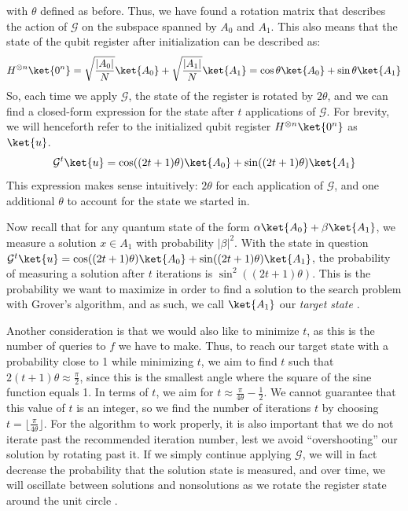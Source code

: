 with $\theta$ defined as before. Thus, we have found a rotation matrix that describes the action of $\mathcal{G}$ on the subspace spanned by $A_0$ and $A_1$. This also means that the state of the qubit register after initialization can be described as:
\[
H^{\otimes n} \ket{0^n} = \sqrt{\frac{|A_0|}{N}}\ket{A_0} + \sqrt{\frac{|A_1|}{N}}\ket{A_1} = \cos \theta \ket{A_0} + \sin \theta \ket{A_1}
\]
So, each time we apply $\mathcal{G}$, the state of the register is rotated by $2\theta$, and we can find a closed-form expression for the state after $t$ applications of $\mathcal{G}$. For brevity, we will henceforth refer to the initialized qubit register $H^{\otimes n} \ket{0^n}$ as $\ket{u}$.
\[
    \mathcal{G}^t \ket{u} = \cos ((2t+1)\theta) \ket{A_0} + \sin ((2t+1)\theta) \ket{A_1}
\]
This expression makes sense intuitively: $2\theta$ for each application of $\mathcal{G}$, and one additional $\theta$ to account for the state we started in.

Now recall that for any quantum state of the 
form $\alpha\ket{A_0} + \beta \ket{A_1}$, we measure a solution $x \in A_1$ with probability $|\beta|^2$. With the state in question $\mathcal{G}^t \ket{u} = \cos ((2t+1)\theta) \ket{A_0} + \sin ((2t+1)\theta) \ket{A_1}$, the probability of measuring a solution after $t$ iterations is $\sin^2((2t+1)\theta)$. This is the probability we want to maximize in order to find a solution to the search problem with Grover's algorithm, and as such, we call $\ket{A_1}$ our \emph{target state} \cite{Qiskit2023}. 

Another consideration is that we would also like to minimize $t$, as this is the number of queries to $f$ we have to make. Thus, to reach our target state with a probability close to 1 while minimizing $t$, we aim to find $t$ such that $2(t+1)\theta \approx \frac{\pi}{2}$, since this is the smallest angle where the square of the sine function equals 1. In terms of $t$, we aim for $t\approx\frac{\pi}{4\theta} - \frac{1}{2}$. We cannot guarantee that this value of $t$ is an integer, so we find the number of iterations $t$ by choosing $t = \lfloor \frac{\pi}{4\theta} \rfloor$. For the algorithm to work properly, it is also important that we do not iterate past the recommended iteration number, lest we avoid ``overshooting'' our solution by rotating past it. If we simply continue applying $\mathcal{G}$, we will in fact decrease the probability that the solution state is measured, and over time, we will oscillate between solutions and nonsolutions as we rotate the register state around the unit circle \cite{Qiskit2023}.

